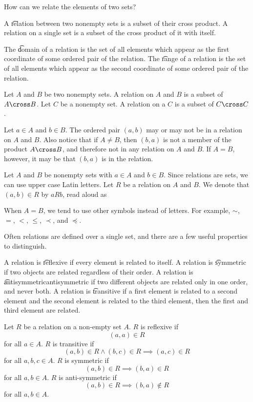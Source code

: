 

How can we relate the elements of two sets?


A \t{relation} between two nonempty sets is a subset of their cross product.
A relation on a single set is a subset of the cross product of it with itself.

The \t{domain} of a relation is the set of all elements which appear as the first coordinate of some ordered pair of the relation.
The \t{range} of a relation is the set of all elements which appear as the second coordinate of some ordered pair of the relation.


Let $A$ and $B$ be two nonempty sets.
A relation on $A$ and $B$ is a subset of $A \cross B$.
Let $C$ be a nonempty set.
A relation on a $C$ is a subset of $C \cross C$.

Let $a \in A$ and $b \in B$.
The ordered pair $(a, b)$ may or may not be in a relation on $A$ and $B$.
Also notice that if $A \neq B$, then $(b, a)$ is not a member of the product $A \cross B$, and therefore not in any relation on $A$ and $B$.
If $A = B$, however, it may be that $(b, a)$ is in the relation.


Let $A$ and $B$ be nonempty sets
with $a \in A$ and $b \in B$.
Since relations are sets,
we can use upper case Latin letters.
Let $R$ be a relation on $A$ and $B$.
We denote that $(a, b) \in R$ by
$a R b$, read aloud as

When $A = B$, we tend to use other symbols instead of letters.
For example,
$\sim$, $=$, $<$,
$\leq$, $\prec$, and $\preceq$.


Often relations are defined over a single set, and there are a few useful properties to distinguish.

A relation is \t{reflexive} if every element is related to itself.
A relation is \t{symmetric} if two objects are related regardless of their order.
A relation is \t{antisymmetric}{antisymmetric} if two different objects are related only in one order, and never both.
A relation is \t{transitive} if a first element is related to a second element and the second element is related to the third element, then the first and third element are related.


Let $R$ be a relation on
a non-empty set $A$.
$R$ is reflexive if
$$(a, a) \in R$$
for all $a \in A$.
$R$ is transitive if
$$(a, b) \in R \land (b, c) \in R \implies (a, c) \in R$$
for all $a, b, c \in A$.
$R$ is symmetric if
$$(a, b) \in R \implies (b, a) \in R$$
for all $a, b \in A$.
$R$ is anti-symmetric if
$$(a, b) \in R \implies (b, a) \not\in R$$
for all $a, b \in A$.
